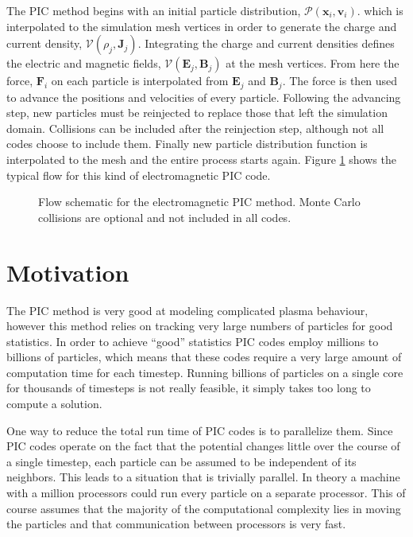 The PIC method begins with an initial particle distribution, $\mathcal{P}(\mathbf{x}_i,\mathbf{v}_i)$. which is interpolated to the simulation mesh vertices in order to generate the charge and current density, $\mathcal{V}(\rho_j,\mathbf{J}_j)$. Integrating the charge and current densities defines the electric and magnetic fields, $\mathcal{V}(\mathbf{E}_j,\mathbf{B}_j)$ at the mesh vertices. From here the force, $\mathbf{F}_i$ on each particle is interpolated from $\mathbf{E}_j$ and $\mathbf{B}_j$. The force is then used to advance the positions and velocities of every particle. Following the advancing step, new particles must be reinjected to replace those that left the simulation domain. Collisions can be included after the reinjection step, although not all codes choose to include them. Finally new particle distribution function is interpolated to the mesh and the entire process starts again. Figure \ref{fig:pic_flowchart} shows the typical flow for this kind of electromagnetic PIC code.\cite{Verboncoeur2005}
\begin{figure}
\begin{center}

\end{center}
\caption[Flow schematic for the PIC method.]{Flow schematic for the electromagnetic PIC method. Monte Carlo collisions are optional and not included in all codes.}
\label{fig:pic_flowchart}
\end{figure}


	\section{Motivation}

	The PIC method is very good at modeling complicated plasma behaviour, however this method relies on tracking very large numbers of particles for good statistics. In order to achieve ``good'' statistics PIC codes employ millions to billions of particles, which means that these codes require a very large amount of computation time for each timestep. Running billions of particles on a single core for thousands of timesteps is not really feasible, it simply takes too long to compute a solution. 
	
	One way to reduce the total run time of PIC codes is to parallelize them. Since PIC codes operate on the fact that the potential changes little over the course of a single timestep, each particle can be assumed to be independent of its neighbors. This leads to a situation that is trivially parallel. In theory a machine with a million processors could run every particle on a separate processor. This of course assumes that the majority of the computational complexity lies in moving the particles and that communication between processors is very fast.  


